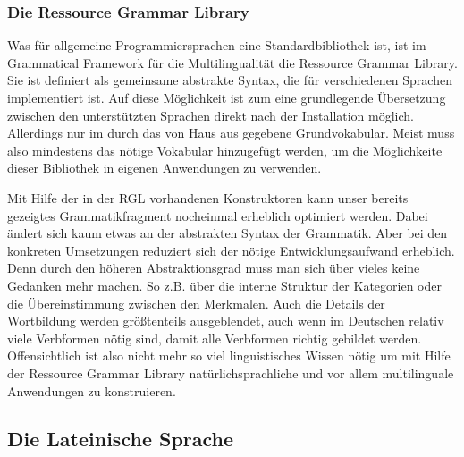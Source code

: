 \documentclass[12pt,abstract=on]{scrreprt}
\begin{document}
\subsubsection{Die Ressource Grammar Library}
Was für allgemeine Programmiersprachen eine Standardbibliothek ist, ist im Grammatical Framework für die Multilingualität die Ressource Grammar Library. Sie ist definiert als gemeinsame abstrakte Syntax, die für verschiedenen Sprachen implementiert ist. Auf diese Möglichkeit ist zum eine grundlegende Übersetzung zwischen den unterstützten Sprachen direkt nach der Installation möglich. Allerdings nur im durch das von Haus aus gegebene Grundvokabular. Meist muss also mindestens das nötige Vokabular hinzugefügt werden, um die Möglichkeite dieser Bibliothek in eigenen Anwendungen zu verwenden. \par
Mit Hilfe der in der RGL vorhandenen Konstruktoren kann unser bereits gezeigtes Grammatikfragment nocheinmal erheblich optimiert werden. Dabei ändert sich kaum etwas an der abstrakten Syntax der Grammatik. Aber bei den konkreten Umsetzungen reduziert sich der nötige Entwicklungsaufwand erheblich. Denn durch den höheren Abstraktionsgrad muss man sich über vieles keine Gedanken mehr machen. So z.B. über die interne Struktur der Kategorien oder die Übereinstimmung zwischen den Merkmalen. Auch die Details der Wortbildung werden größtenteils ausgeblendet, auch wenn im Deutschen relativ viele Verbformen nötig sind, damit alle Verbformen richtig gebildet werden. Offensichtlich ist also nicht mehr so viel linguistisches Wissen nötig um mit Hilfe der Ressource Grammar Library natürlichsprachliche und vor allem multilinguale Anwendungen zu konstruieren.



\pagebreak
\FloatBarrier
\subsection{Die Lateinische Sprache}
\end{document}
